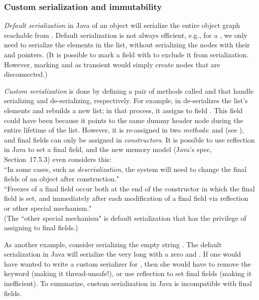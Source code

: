 \vspace{-0.2cm} %
\subsubsection{Custom serialization and immutability}
\emph{Default serialization} in Java of an object 
    will serialize the entire object graph reachable from .
Default serialization is not always efficient, e.g.,
    for a , we only need to serialize the elements in the list,
    without serializing the nodes with their  and  pointers.
(It is possible to mark a field with  to exclude it from serialization.
    However, marking  and  as transient would simply create nodes
        that are disconnected.)

\emph{Custom serialization} is done by defining a pair of methods called
     and 
    that handle serializing and de-serializing, respectively.
For example,  in 
    de-serializes the list's elements and rebuilds a new list;
    in that process, it assigns to field .
This field could have been  because it points to the same dummy header node
    during the entire lifetime of the list.
However, it is re-assigned in two \emph{methods}:
     and  (see ),
    and final fields can only be assigned in
    \emph{constructors}.
It is possible to use reflection in Java to set a final field,
    and the new memory model (Java's spec, Section~17.5.3)
    even considers this:\\
``In some cases, such as \emph{deserialization}, the system will need to change
    the final fields of an object after construction."\\
``Freezes of a final field occur both at the end of the constructor in which the final field is set,
    and immediately after each modification of a final field via reflection or other special mechanism."\\
(The ``other special mechanism" is default serialization that has the privilege of assigning to final fields.)

As another example, consider serializing the empty string .
The default serialization in Java will serialize the very long  with a zero  and .
If one would have wanted to write a custom serializer for ,
    then she would have to remove the  keyword (making it thread-unsafe!),
    or use reflection to set final fields (making it inefficient).
To summarize, custom serialization in Java is incompatible with final fields.

